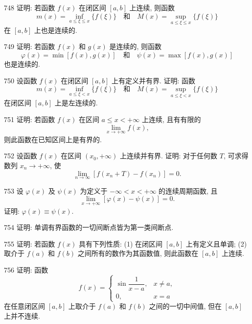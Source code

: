 \begin{prob}[M]{748}
证明: 若函数 $f(x)$ 在闭区间 $[a, b]$ 上连续, 则函数
\[
m(x) = \inf_{a \leqslant \xi \leqslant x} \{f(\xi)\} \quad \text{和} \quad M(x) = \sup_{a \leqslant \xi \leqslant x} \{f(\xi)\}
\]
在 $[a, b]$ 上也是连续的.
\end{prob}

\begin{prob}[M]{749}
证明: 若函数 $f(x)$ 和 $g(x)$ 是连续的, 则函数
\[
\varphi(x) = \min[f(x), g(x)] \quad \text{和} \quad \psi(x) = \max[f(x), g(x)]
\]
也是连续的.
\end{prob}

\begin{prob}[M]{750}
设函数 $f(x)$ 在闭区间 $[a, b]$ 上有定义并有界. 证明: 函数
\[
m(x) = \inf_{a \leqslant \xi < x} \{f(\xi)\} \quad \text{和} \quad M(x) = \sup_{a \leqslant \xi < x} \{f(\xi)\}
\]
在闭区间 $[a, b]$ 上是左连续的.
\end{prob}

\begin{prob}[M]{751}
证明: 若函数 $f(x)$ 在区间 $a \leqslant x < +\infty$ 上连续, 且有有限的
\[
\lim_{x \to +\infty} f(x),
\]
则此函数在已知区间上是有界的.
\end{prob}

\begin{prob}[M]{752}
设函数 $f(x)$ 在区间 $(x_0, +\infty)$ 上连续并有界. 证明: 对于任何数 $T$, 可求得数列 $x_n \to +\infty$, 使
\[
\lim_{n \to \infty} [f(x_n + T) - f(x_n)] = 0.
\]
\end{prob}

\begin{prob}[M]{753}
设 $\varphi(x)$ 及 $\psi(x)$ 为定义于 $-\infty < x < +\infty$ 的连续周期函数, 且
\[
\lim_{x \to +\infty} [\varphi(x) - \psi(x)] = 0.
\]
证明: $\varphi(x) \equiv \psi(x)$.
\end{prob}

\begin{prob}[M]{754}
证明: 单调有界函数的一切间断点皆为第一类间断点.
\end{prob}

\begin{prob}[M]{755}
证明: 若函数 $f(x)$ 具有下列性质: (1) 在闭区间 $[a, b]$ 上有定义且单调; (2) 取介于 $f(a)$ 和 $f(b)$ 之间所有的数作为其函数值, 则此函数在 $[a, b]$ 上连续.
\end{prob}

\begin{prob}[M]{756}
证明: 函数
\[
f(x) = \begin{cases}
\sin \dfrac{1}{x - a}, & x \neq a, \\
0, & x = a
\end{cases}
\]
在任意闭区间 $[a, b]$ 上取介于 $f(a)$ 和 $f(b)$ 之间的一切中间值, 但在 $[a, b]$ 上并不连续.
\end{prob}

